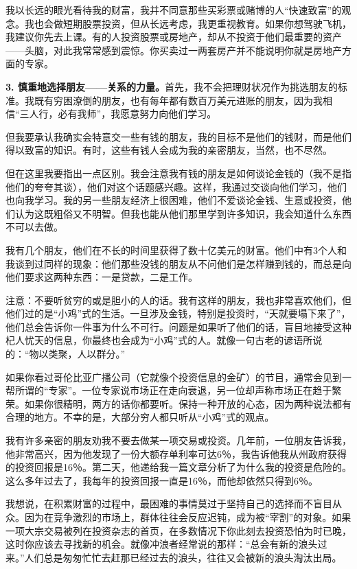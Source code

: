 我以长远的眼光看待我的财富，我并不同意那些买彩票或赌博的人“快速致富”的观念。我也会做短期股票投资，但从长远考虑，我更重视教育。如果你想驾驶飞机，我建议你先去上课。有的人投资股票或房地产，却从不投资于他们最重要的资产——头脑，对此我常常感到震惊。你买卖过一两套房产并不能说明你就是房地产方面的专家。

\textbf{3. 慎重地选择朋友——关系的力量。}首先，我不会把理财状况作为挑选朋友的标准。我既有穷困潦倒的朋友，也有每年都有数百万美元进账的朋友，因为我相信“三人行，必有我师”，我愿意努力向他们学习。

但我要承认我确实会特意交一些有钱的朋友，我的目标不是他们的钱财，而是他们得以致富的知识。有时，这些有钱人会成为我的亲密朋友，当然，也不尽然。

但在这里我要指出一点区别。我会注意我有钱的朋友是如何谈论金钱的（我不是指他们的夸夸其谈），他们对这个话题感兴趣。这样，我通过交谈向他们学习，他们也向我学习。我的另一些朋友经济上很困难，他们不爱谈论金钱、生意或投资，他们认为这既粗俗又不明智。但我也能从他们那里学到许多知识，我会知道什么东西不可以去做。

我有几个朋友，他们在不长的时间里获得了数十亿美元的财富。他们中有3个人和我谈到过同样的现象：他们那些没钱的朋友从不问他们是怎样赚到钱的，而总是向他们要求这两种东西：一是贷款，二是工作。

注意：不要听贫穷的或是胆小的人的话。我有这样的朋友，我也非常喜欢他们，但他们过的是“小鸡”式的生活。一旦涉及金钱，特别是投资时，“天就要塌下来了”，他们总会告诉你一件事为什么不可行。问题是如果听了他们的话，盲目地接受这种杞人忧天的信息，你最终也会成为“小鸡”式的人。就像一句古老的谚语所说的：“物以类聚，人以群分。”

如果你看过哥伦比亚广播公司（它就像个投资信息的金矿）的节目，通常会见到一帮所谓的“专家”。一位专家说市场正在走向衰退，另一位却声称市场正在趋于繁荣。如果你很精明，两方的话你都要听。保持一种开放的心态，因为两种说法都有合理的地方。不幸的是，大部分穷人都只听从“小鸡”式的观点。

我有许多亲密的朋友劝我不要去做某一项交易或投资。几年前，一位朋友告诉我，他非常高兴，因为他发现了一份大额存单利率可达6％，我告诉他我从州政府获得的投资回报是16％。第二天，他递给我一篇文章分析了为什么我的投资是危险的。这么多年过去了，我每年的投资回报一直是16％，而他却依然只得到6％。

我想说，在积累财富的过程中，最困难的事情莫过于坚持自己的选择而不盲目从众。因为在竞争激烈的市场上，群体往往会反应迟钝，成为被“宰割”的对象。如果一项大宗交易被列在投资杂志的首页，在多数情况下你此刻去投资恐怕为时已晚，这时你应该去寻找新的机会。就像冲浪者经常说的那样：“总会有新的浪头过来。”人们总是匆匆忙忙去赶那已经过去的浪头，往往又会被新的浪头淘汰出局。

